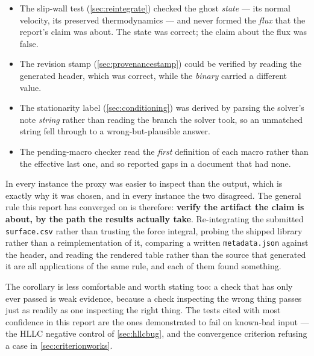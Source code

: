 \begin{itemize}
  \item The slip-wall test (\cref{sec:reintegrate}) checked the ghost \emph{state} ---
  its normal velocity, its preserved thermodynamics --- and never formed the \emph{flux}
  that the report's claim was about. The state was correct; the claim about the flux was
  false.
  \item The revision stamp (\cref{sec:provenancestamp}) could be verified by reading the
  generated header, which was correct, while the \emph{binary} carried a different value.
  \item The stationarity label (\cref{sec:conditioning}) was derived by parsing the
  solver's note \emph{string} rather than reading the branch the solver took, so an
  unmatched string fell through to a wrong-but-plausible answer.
  \item The pending-macro checker read the \emph{first} definition of each macro rather
  than the effective last one, and so reported gaps in a document that had none.
\end{itemize}

In every instance the proxy was easier to inspect than the output, which is exactly why it
was chosen, and in every instance the two disagreed. The general rule this report has
converged on is therefore: \textbf{verify the artifact the claim is about, by the path the
results actually take}. Re-integrating the submitted \texttt{surface.csv} rather than
trusting the force integral, probing the shipped library rather than a reimplementation of
it, comparing a written \texttt{metadata.json} against the header, and reading the rendered
table rather than the source that generated it are all applications of the same rule, and
each of them found something.

The corollary is less comfortable and worth stating too: a check that has only ever passed
is weak evidence, because a check inspecting the wrong thing passes just as readily as one
inspecting the right thing. The tests cited with most confidence in this report are the ones
demonstrated to fail on known-bad input --- the HLLC negative control of \cref{sec:hllcbug},
and the convergence criterion refusing a case in \cref{sec:criterionworks}.
